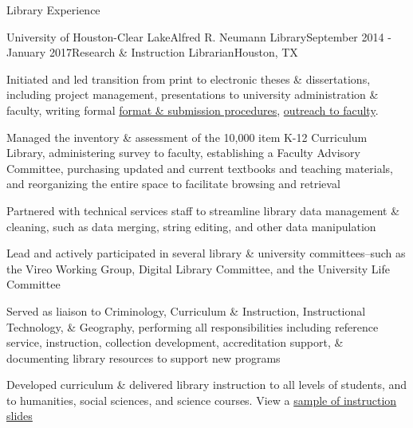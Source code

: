 \documentclass{resume} %
\begin{document}
\begin{rSection}{Library Experience}
\begin{rSubsection}{University of Houston-Clear Lake}{Alfred R. Neumann Library}{September 2014 - January 2017}{Research \& Instruction Librarian}{Houston, TX}
\item Initiated and led transition from print to electronic theses \& dissertations, including project management, presentations to university administration \& faculty, writing formal \href{http://uhcl.libguides.com/dissertation}{format \& submission procedures}, \href{http://uhcl.libguides.com/thesesdissertations}{outreach to faculty}. 
\item Managed the inventory \& assessment of the 10,000 item K-12 Curriculum Library, administering survey to faculty, establishing a Faculty Advisory Committee, purchasing updated and current textbooks and teaching materials, and reorganizing the entire space to facilitate browsing and retrieval
\item Partnered with technical services staff to streamline library data management \& cleaning, such as data merging, string editing, and other data manipulation
\item Lead and actively participated in several library \& university committees--such as the Vireo Working Group, Digital Library Committee, and the University Life Committee
\item Served as liaison to Criminology, Curriculum \& Instruction, Instructional Technology, \& Geography, performing all responsibilities including reference service, instruction, collection development, accreditation support, \& documenting library resources to support new programs
\item Developed curriculum \& delivered library instruction to all levels of students, and to humanities, social sciences, and science courses. View a \href{https://www.slideshare.net/ciakov/presentations}{sample of instruction slides}
\end{rSubsection}

\pagebreak


\end{rSection}
\end{document}
